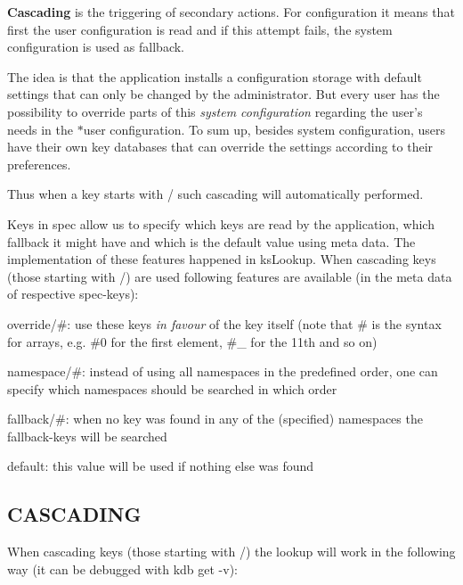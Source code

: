 {\bfseries Cascading} is the triggering of secondary actions. For configuration it means that first the user configuration is read and if this attempt fails, the system configuration is used as fallback.

The idea is that the application installs a configuration storage with default settings that can only be changed by the administrator. But every user has the possibility to override parts of this {\itshape system configuration} regarding the user's needs in the $\ast$user configuration. To sum up, besides system configuration, users have their own key databases that can override the settings according to their preferences.

Thus when a key starts with {\ttfamily /} such cascading will automatically performed.

Keys in {\ttfamily spec} allow us to specify which keys are read by the application, which fallback it might have and which is the default value using meta data. The implementation of these features happened in {\ttfamily ks\+Lookup}. When cascading keys (those starting with {\ttfamily /}) are used following features are available (in the meta data of respective {\ttfamily spec}-\/keys)\+:


\begin{DoxyItemize}
\item {\ttfamily override/\#}\+: use these keys {\itshape in favour} of the key itself (note that {\ttfamily \#} is the syntax for arrays, e.\+g. {\ttfamily \#0} for the first element, {\ttfamily \#\+\_} for the 11th and so on)
\item {\ttfamily namespace/\#}\+: instead of using all namespaces in the predefined order, one can specify which namespaces should be searched in which order
\item {\ttfamily fallback/\#}\+: when no key was found in any of the (specified) namespaces the {\ttfamily fallback}-\/keys will be searched
\item {\ttfamily default}\+: this value will be used if nothing else was found
\end{DoxyItemize}

\subsection*{C\+A\+S\+C\+A\+D\+I\+N\+G}

When cascading keys (those starting with {\ttfamily /}) the lookup will work in the following way (it can be debugged with {\ttfamily kdb get -\/v})\+:

